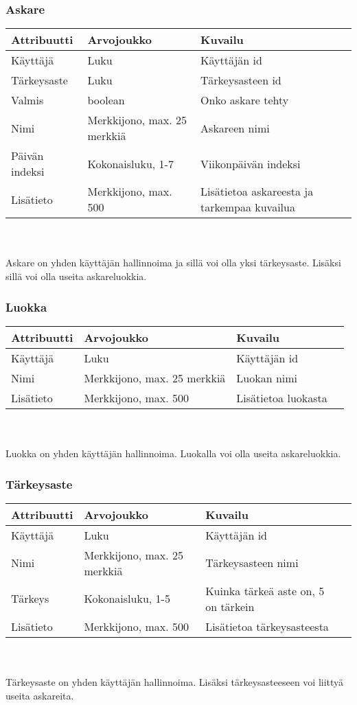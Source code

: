 \documentclass{report}
\begin{document}
\subsubsection*{Askare}
\begin{tabular}{ | l | l | l | p{7.5cm} |} \hline
\textbf{Attribuutti} & \textbf{Arvojoukko} & \textbf{Kuvailu} \\ \hline
Käyttäjä & Luku & Käyttäjän id \\ \hline
Tärkeysaste & Luku & Tärkeysasteen id \\ \hline
Valmis & boolean & Onko askare tehty \\ \hline
Nimi & Merkkijono, max. 25 merkkiä & Askareen nimi \\ \hline
Päivän indeksi & Kokonaisluku, 1-7 & Viikonpäivän indeksi \\ \hline
Lisätieto & Merkkijono, max. 500 & Lisätietoa askareesta ja tarkempaa kuvailua \\ \hline
\end{tabular}
\\ \\ Askare on yhden käyttäjän hallinnoima ja sillä voi olla yksi tärkeysaste. Lisäksi sillä voi olla useita askareluokkia. 

\subsubsection*{Luokka}
\begin{tabular}{ | l | l | l | p{7.5cm} |} \hline
\textbf{Attribuutti} & \textbf{Arvojoukko} & \textbf{Kuvailu} \\ \hline
Käyttäjä & Luku & Käyttäjän id \\ \hline
Nimi & Merkkijono, max. 25 merkkiä & Luokan nimi \\ \hline
Lisätieto & Merkkijono, max. 500 & Lisätietoa luokasta \\ \hline
\end{tabular}
\\ \\ Luokka on yhden käyttäjän hallinnoima. Luokalla voi olla useita askareluokkia.
\subsubsection*{Tärkeysaste}
\begin{tabular}{ | l | l | l | p{7.5cm} |} \hline
\textbf{Attribuutti} & \textbf{Arvojoukko} & \textbf{Kuvailu} \\ \hline
Käyttäjä & Luku & Käyttäjän id \\ \hline
Nimi & Merkkijono, max. 25 merkkiä & Tärkeysasteen nimi \\ \hline
Tärkeys & Kokonaisluku, 1-5 & Kuinka tärkeä aste on, 5 on tärkein \\ \hline
Lisätieto & Merkkijono, max. 500 & Lisätietoa tärkeysasteesta \\ \hline
\end{tabular}
\\ \\ Tärkeysaste on yhden käyttäjän hallinnoima. Lisäksi tärkeysasteeseen voi liittyä useita askareita.
\end{document}

